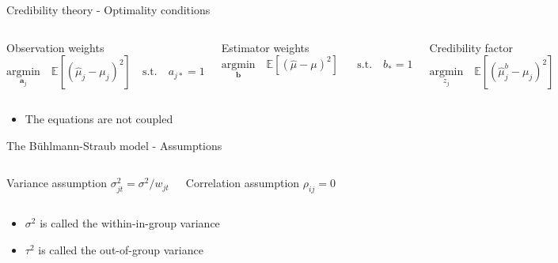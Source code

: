 \documentclass{beamer}
\begin{document}
\begin{frame}{Credibility theory - Optimality conditions}

\begin{columns}
    \begin{block}{Observation weights}
   $\underset{\bm a_j}{\text{argmin}} \quad \mathds{E}[(\hat\mu_j - \mu_j)^2]  \quad \text{s.t.} \quad a_{j\ast}=1$
    \end{block}
        \begin{block}{Estimator weights}
   $\underset{\bm b}{\text{argmin}} \quad \mathds{E}[(\hat\mu - \mu)^2]  \,\,\,\,\quad \text{s.t.} \quad b_\ast=1$
    \end{block}
        \begin{block}{Credibility factor}
   $\underset{z_j}{\text{argmin}} \quad \mathds{E}[(\hat\mu_j^b - \mu_j)^2]$
    \end{block}
\end{columns}

\vspace{0.5cm}

\begin{itemize}
    \item The equations are not coupled
\end{itemize}
    
\end{frame}



\begin{frame}{The Bühlmann-Straub model - Assumptions} 

\begin{columns}
    \begin{block}{Variance assumption}
   $\sigma_{jt}^2 = \sigma^2/w_{jt}$
    \end{block}
    \begin{block}{Correlation assumption}
    $\rho_{ij}=0$
    \end{block}
\end{columns}

\vspace{0.5cm}

\begin{itemize}
    \item $\sigma^2$ is called the within-in-group variance
    \item $\tau^2$ is called the out-of-group variance
\end{itemize}

\end{frame}
\end{document}
